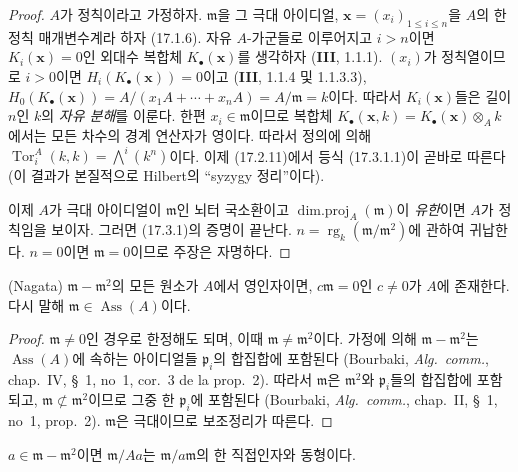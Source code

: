 \begin{proof}
$A$가 정칙이라고 가정하자. $\mathfrak{m}$을 그 극대 아이디얼,
$\mathbf{x}=(x_i)_{1\leq i\leq n}$을 $A$의 한 정칙 매개변수계라 하자
(17.1.6). 자유 $A$-가군들로 이루어지고 $i>n$이면
$K_i(\mathbf{x})=0$인 외대수 복합체 $K_\bullet(\mathbf{x})$를 생각하자
(\textbf{III}, 1.1.1). $(x_i)$가 정칙열이므로 $i>0$이면
$H_i(K_\bullet(\mathbf{x}))=0$이고 (\textbf{III}, 1.1.4 및 1.1.3.3),
$H_0(K_\bullet(\mathbf{x}))=A/(x_1A+\cdots+x_nA)=A/\mathfrak{m}=k$이다.
따라서 $K_i(\mathbf{x})$들은 길이 $n$인 $k$의 \emph{자유 분해}를
이룬다. 한편 $x_i\in\mathfrak{m}$이므로 복합체
$K_\bullet(\mathbf{x},k)=K_\bullet(\mathbf{x})\otimes_A k$에서는 모든
차수의 경계 연산자가 영이다. 따라서 정의에 의해
$\operatorname{Tor}^A_i(k,k)=\bigwedge^i(k^n)$이다. 이제 (17.2.11)에서
등식 (17.3.1.1)이 곧바로 따른다 (이 결과가 본질적으로 Hilbert의
``syzygy 정리''이다).

이제 $A$가 극대 아이디얼이 $\mathfrak{m}$인 뇌터 국소환이고
$\operatorname{dim.proj}_A(\mathfrak{m})$이 \emph{유한}이면 $A$가
정칙임을 보이자. 그러면 (17.3.1)의 증명이 끝난다.
$n=\operatorname{rg}_k(\mathfrak{m}/\mathfrak{m}^2)$에 관하여
귀납한다. $n=0$이면 $\mathfrak{m}=0$이므로 주장은 자명하다.
\end{proof}

\begin{lemma}[17.3.1.2]
\label{0.17.3.1.2-fr}
\textnormal{(Nagata)} $\mathfrak{m}-\mathfrak{m}^2$의 모든 원소가
$A$에서 영인자이면, $c\mathfrak{m}=0$인 $c\neq0$가 $A$에 존재한다.
다시 말해 $\mathfrak{m}\in\operatorname{Ass}(A)$이다.
\end{lemma}

\begin{proof}
$\mathfrak{m}\neq0$인 경우로 한정해도 되며, 이때
$\mathfrak{m}\neq\mathfrak{m}^2$이다. 가정에 의해
$\mathfrak{m}-\mathfrak{m}^2$는 $\operatorname{Ass}(A)$에 속하는
아이디얼들 $\mathfrak{p}_i$의 합집합에 포함된다 (Bourbaki,
\emph{Alg.~comm.}, chap.~IV, \S~1, no~1, cor.~3 de la prop.~2).
따라서 $\mathfrak{m}$은 $\mathfrak{m}^2$와 $\mathfrak{p}_i$들의
합집합에 포함되고,
$\mathfrak{m}\not\subset\mathfrak{m}^2$이므로 그중 한
$\mathfrak{p}_i$에 포함된다 (Bourbaki, \emph{Alg.~comm.}, chap.~II,
\S~1, no~1, prop.~2). $\mathfrak{m}$은 극대이므로 보조정리가 따른다.
\end{proof}

\begin{lemma}[17.3.1.3]
\label{0.17.3.1.3-fr}
$a\in\mathfrak{m}-\mathfrak{m}^2$이면 $\mathfrak{m}/Aa$는
$\mathfrak{m}/a\mathfrak{m}$의 한 직접인자와 동형이다.
\end{lemma}

